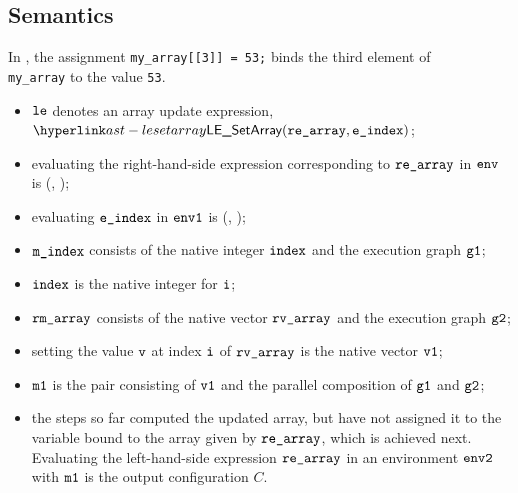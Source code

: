 \subsection{Semantics}
In , the assignment \verb|my_array[[3]] = 53;| binds the third element
of \\
\texttt{my\_array} to the value \texttt{53}.

\ProseParagraph
\AllApply
\begin{itemize}
  \item $\vle$ denotes an array update expression, $\LESetArray(\rearray, \eindex)$;
  \item evaluating the right-hand-side expression corresponding to $\rearray$ in $\env$
  is \Normal(\rmarray, \envone)\ProseOrAbnormal;
  \item evaluating $\eindex$ in $\envone$ is \Normal(\mindex, \envtwo)\ProseOrAbnormal;
  \item $\mindex$ consists of the native integer $\vindex$ and the execution graph $\vgone$;
  \item $\vindex$ is the native integer for $\vi$;
  \item $\rmarray$ consists of the native vector $\rvarray$ and the execution graph $\vgtwo$;
  \item setting the value $\vv$ at index $\vi$ of $\rvarray$ is the native vector $\vvone$;
  \item $\vmone$ is the pair consisting of $\vvone$ and the parallel composition of $\vgone$ and $\vgtwo$;
  \item the steps so far computed the updated array, but have not assigned it to the variable
  bound to the array given by $\rearray$, which is achieved next.
  Evaluating the left-hand-side expression $\rearray$ in an environment $\envtwo$ with $\vmone$
  is the output configuration $C$.
\end{itemize}
\FormallyParagraph
\begin{mathpar}
\end{mathpar}

